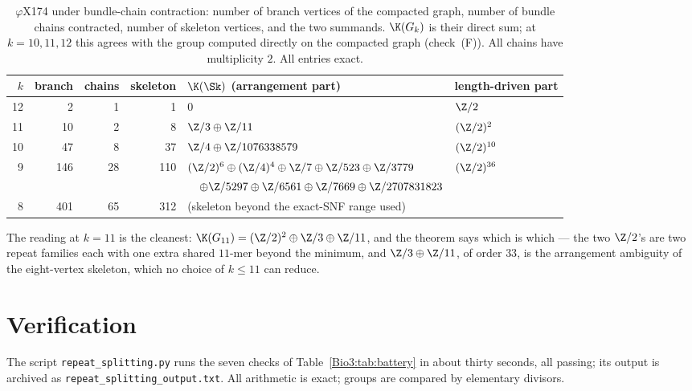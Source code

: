 \begin{table}[ht]
\centering\footnotesize
\begin{tabular}{rrrrll}
\toprule
$k$ & branch & chains & skeleton & $\K(\Sk)$ (arrangement part) & length-driven part\\
\midrule
12 &   2 &  1 &   1 & $0$ & $\Z/2$\\
11 &  10 &  2 &   8 & $\Z/3\oplus\Z/11$ & $(\Z/2)^{2}$\\
10 &  47 &  8 &  37 & $\Z/4\oplus\Z/1076338579$ & $(\Z/2)^{10}$\\
 9 & 146 & 28 & 110 & $(\Z/2)^{6}\oplus(\Z/4)^{4}\oplus\Z/7\oplus\Z/523\oplus\Z/3779$ & $(\Z/2)^{36}$\\
   &     &    &     & $\quad\oplus\Z/5297\oplus\Z/6561\oplus\Z/7669\oplus\Z/2707831823$ & \\
 8 & 401 & 65 & 312 & (skeleton beyond the exact-SNF range used) & \\
\bottomrule
\end{tabular}
\caption{$\varphi$X174 under bundle-chain contraction: number of branch vertices of the
compacted graph, number of bundle chains contracted, number of skeleton vertices, and the
two summands. $\K(G_k)$ is their direct sum; at $k=10,11,12$ this agrees with the group
computed directly on the compacted graph (check~(F)). All chains have multiplicity $2$.
All entries exact.}
\label{Bio3:tab:phix}
\end{table}

The reading at $k=11$ is the cleanest: $\K(G_{11})=(\Z/2)^{2}\oplus\Z/3\oplus\Z/11$, and
the theorem says which is which --- the two $\Z/2$'s are two repeat families each with one
extra shared $11$-mer beyond the minimum, and $\Z/3\oplus\Z/11$, of order $33$, is the
arrangement ambiguity of the eight-vertex skeleton, which no choice of $k\le11$ can
reduce.

\section{Verification}\label{Bio3:sec:battery}

The script \texttt{repeat\_splitting.py} runs the seven checks of Table~\ref{Bio3:tab:battery}
in about thirty seconds, all passing; its output is archived as
\texttt{repeat\_splitting\_output.txt}. All arithmetic is exact; groups are compared by
elementary divisors.

